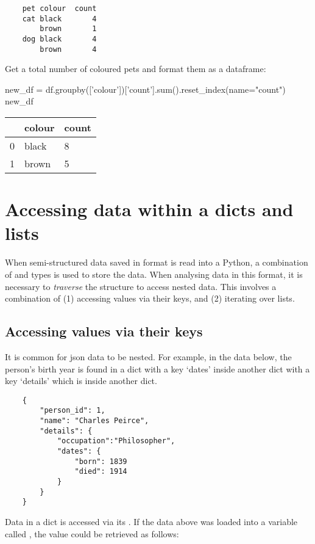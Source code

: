 \begin{verbatim}
    pet colour  count
    cat black       4
        brown       1
    dog black       4
        brown       4
\end{verbatim}

Get a total number of coloured pets and format them as a dataframe:

\begin{pycode}
    new_df = df.groupby(['colour'])['count'].sum().reset_index(name="count")
    new_df
\end{pycode}

\begin{tabular}{l l l}
      & colour & count \\
    \hline
    0 & black  & 8     \\
    1 & brown  & 5     \\
\end{tabular}

\section{Accessing data within a dicts and lists}

When semi-structured data saved in  format is read into a Python, a combination of  and  types is used to store the data. When analysing data in this format, it is necessary to \textit{traverse} the structure to access nested data. This involves a combination of (1) accessing values via their keys, and (2) iterating over lists.

\subsection{Accessing values via their keys}

It is common for json data to be nested. For example, in the data below, the person's birth year is found in a dict with a key `dates' inside another dict with a key `details' which is inside another dict.

\begin{verbatim}
    {
        "person_id": 1,
        "name": "Charles Peirce",
        "details": {
            "occupation":"Philosopher",
            "dates": {
                "born": 1839
                "died": 1914
            }
        }
    }
\end{verbatim}

Data in a dict is accessed via its . If the data above was loaded into a variable called , the  value could be retrieved as follows:

